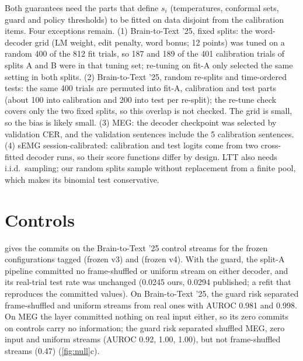 Both guarantees need the parts that define $s_i$ (temperatures, conformal sets, guard and policy thresholds) to be fitted on data disjoint from the calibration items. Four exceptions remain. (1) Brain-to-Text '25, fixed splits: the word-decoder grid (LM weight, edit penalty, word bonus; 12 points) was tuned on a random 400 of the 812 fit trials, so 187 and 189 of the 401 calibration trials of splits A and B were in that tuning set; re-tuning on fit-A only selected the same setting in both splits. (2) Brain-to-Text '25, random re-splits and time-ordered tests: the same 400 trials are permuted into fit-A, calibration and test parts (about 100 into calibration and 200 into test per re-split); the re-tune check covers only the two fixed splits, so this overlap is not checked. The grid is small, so the bias is likely small. (3) MEG: the decoder checkpoint was selected by validation CER, and the validation sentences include the 5 calibration sentences. (4) sEMG session-calibrated: calibration and test logits come from two cross-fitted decoder runs, so their score functions differ by design. LTT also needs i.i.d.\ sampling; our random splits sample without replacement from a finite pool, which makes its binomial test conservative.

\section{Controls}
\label{app:controls}

 gives the commits on the Brain-to-Text '25 control streams for the frozen configurations tagged  (frozen v3) and  (frozen v4). With the guard, the split-A pipeline committed no frame-shuffled or uniform stream on either decoder, and its real-trial test rate was unchanged (0.0245 ours, 0.0294 published; a refit that reproduces the committed values). On Brain-to-Text '25, the guard risk separated frame-shuffled and uniform streams from real ones with AUROC 0.981 and 0.998. On MEG the layer committed nothing on real input either, so its zero commits on controls carry no information; the guard risk separated shuffled MEG, zero input and uniform streams (AUROC 0.92, 1.00, 1.00), but not frame-shuffled streams (0.47) (\cref{fig:null}c).

